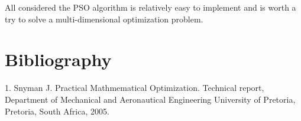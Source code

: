 \documentclass[a4paper,10pt]{article}
\begin{document}
All considered the PSO algorithm is relatively easy to implement and is worth a try to solve a multi-dimensional optimization problem.

\section{Bibliography}
1. Snyman J. Practical Mathmematical Optimization. Technical report, Department of Mechanical and Aeronautical Engineering University of Pretoria, Pretoria, South Africa, 2005. 
\end{document}
